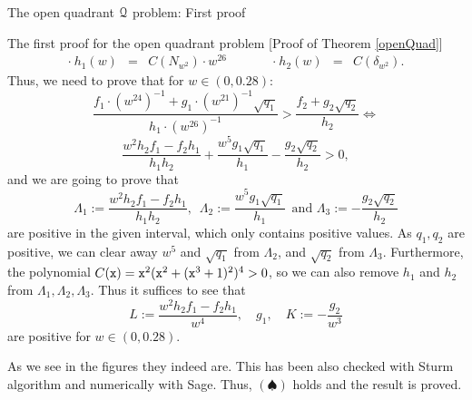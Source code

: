 \documentclass[11pt, a4paper, english, twoside, notitlepage, openright]{report}
\begin{document}
\begin{chapter}{The open quadrant $\mathcal{Q}$ problem: First proof}
\begin{section}{The first proof for the open quadrant problem} [Proof of Theorem \ref{openQuad}]
$$\begin{array}{rclcrcl}
\cdot\ h_1(w)&=&C(N_{w^2})\cdot w^{26}& \qquad &\cdot\ h_2(w)&=&C(\delta_{w^2}).
\end{array}
$$
Thus, we need to prove that for $w\in(0,0.28)$:
$$
\frac{f_1\cdot(w^{24})^{-1}+g_1\cdot (w^{21})^{-1}\sqrt{q_1}}{h_1\cdot(w^{26})^{-1}}>\frac{f_2+g_2\sqrt{q_2}}{h_2} \iff
$$
$$
\frac{w^2h_2f_1-f_2h_1}{h_1h_2}+\frac{w^5g_1\sqrt{q_1}}{h_1}-\frac{g_2\sqrt{q_2}}{h_2}>0,
$$
and we are going to prove that 
$$
\Lambda_1:= \frac{w^2h_2f_1-f_2h_1}{h_1h_2},\, \, \, \Lambda_2:=\frac{w^5g_1\sqrt{q_1}}{h_1} \, \text{ and } \Lambda_3 := -\frac{g_2\sqrt{q_2}}{h_2}
$$
are positive in the given interval, which only contains positive values. As $q_1,q_2$ are positive, we can clear away $w^5$ and $\sqrt{q_1}$ from $\Lambda_2$, and $\sqrt{q_2}$ from $\Lambda_3$. Furthermore, the polynomial $C({\tt x})={\tt x}^2({\tt x}^2+({\tt x}^3+1)^2)^4>0$, so we can also remove $h_1$ and $h_2$ from $\Lambda_1,\Lambda_2, \Lambda_3$. Thus it suffices to see that
$$
L:=\frac{w^2h_2f_1-f_2h_1}{w^4},\quad g_1,\quad K:=-\frac{g_2}{w^3}
$$ 
are positive for $w\in(0,0.28)$.

\vspace{2cm}

As we see in the figures they indeed are. This has been also checked with Sturm algorithm and numerically with Sage. Thus, $(\spadesuit)$ holds and the result is proved.


\end{section}
\end{chapter}
\end{document}
